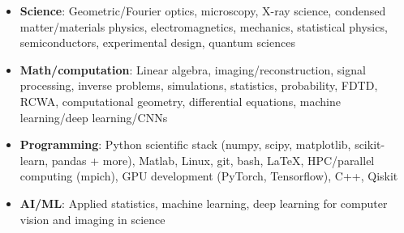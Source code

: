 \begin{itemize}
    \item \textbf{Science}: Geometric/Fourier optics, microscopy, X-ray science, condensed matter/materials physics, electromagnetics, mechanics, statistical physics, semiconductors, experimental design, quantum sciences \par
    \item \textbf{Math/computation}: Linear algebra, imaging/reconstruction, signal processing, inverse problems, simulations, statistics, probability, FDTD, RCWA, computational geometry, differential equations, machine learning/deep learning/CNNs \par
    \item \textbf{Programming}: Python scientific stack (numpy, scipy, matplotlib, scikit-learn, pandas + more), Matlab, Linux, git, bash, \LaTeX, HPC/parallel computing (mpich), GPU development (PyTorch, Tensorflow), C++, Qiskit \par
    \item\textbf{AI/ML}: Applied statistics, machine learning, deep learning for computer vision and imaging in science \par
\end{itemize}
